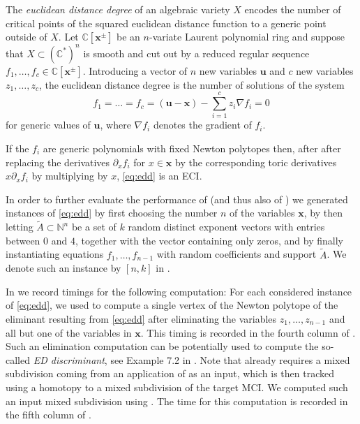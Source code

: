 \documentclass[a4paper]{article}
\theoremstyle{remark}
\def\NN{\mathbb{N}}
\def\CC{\mathbb{C}}
\def\xx{\mathbf{x}}
\begin{document}
The {\em euclidean distance degree}
\cite{draismaEuclideanDistanceDegree2016} of an algebraic variety $X$
encodes the number of critical points of the squared euclidean
distance function to a generic point outside of $X$. Let
$\CC[\xx^{\pm}]$ be an $n$-variate Laurent polynomial ring and suppose
that $X\subset (\CC^{*})^{n}$ is smooth and cut out by a reduced regular
sequence $f_1,\dots,f_c\in \CC[\xx^{\pm}]$. Introducing a vector of
$n$ new variables $\mathbf{u}$ and $c$ new variables $z_1,\dots,z_c$,
the euclidean distance degree is the number of solutions of the system
\begin{equation}
  \label{eq:edd}
  f_1 = \ldots = f_c = (\mathbf{u} - \xx) - \sum_{i=1}^c z_i \nabla f_i = 0 
\end{equation}
for generic values of $\mathbf{u}$, where $\nabla f_i$ denotes the gradient
of $f_i$.

If the $f_i$ are generic polynomials with fixed Newton polytopes then,
after after replacing the derivatives $\partial_{x} f_i$ for
$x\in \xx$ by the corresponding toric derivatives $x\partial_xf_i$ by
multiplying by $x$, \eqref{eq:edd} is an ECI.

In order to further evaluate the performance of 
(and thus also of ) we generated instances of
\eqref{eq:edd} by first choosing the number $n$ of the variables
$\xx$, by then letting $\tilde{A}\subset \NN^n$ be a set of $k$ random
distinct exponent vectors with entries between $0$ and $4$, together
with the vector containing only zeros, and by finally instantiating
equations $f_1,\dots,f_{n-1}$ with random coefficients and support
$\tilde{A}$. We denote such an instance by $[n,k]$ in .

In  we record timings for the following computation: For
each considered instance of \eqref{eq:edd}, we used
 to compute a single vertex of the Newton polytope
of the eliminant resulting from \eqref{eq:edd} after eliminating the
variables $z_1,\ldots, z_{n-1}$ and all but one of the variables in
$\xx$. This timing is recorded in the fourth column of
. Such an elimination computation can be potentially
used to compute the so-called {\em ED discriminant}, see Example 7.2
in \cite{draismaEuclideanDistanceDegree2016}. Note that
 already requires a mixed subdivision coming from
an application of  as an input, which is then tracked
using a homotopy to a mixed subdivision of the target MCI. We computed
such an input mixed subdivision using . The time for
this computation is recorded in the fifth column of .
\end{document}
